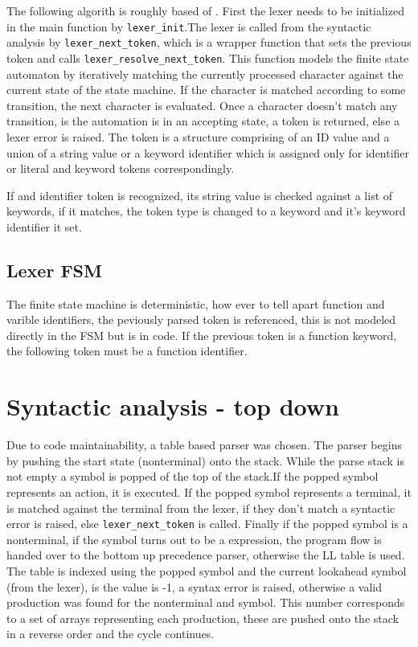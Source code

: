 \documentclass[11pt]{article}
\begin{document}
The following algorith is roughly based of \cite[p.~62]{10.5555/77624}. First the lexer needs to be initialized in the main function by \texttt{lexer\_init}.The lexer is called from the syntactic analysis by \texttt{lexer\_next\_token}, which is a wrapper function that sets the previous token and calls \texttt{lexer\_resolve\_next\_token}. This function models the finite state automaton by iteratively matching the currently processed character against the current state of the state machine. If the character is matched according to some transition, the next character is evaluated. Once a character doesn't match any transition, is the automation is in an accepting state, a token is returned, else a lexer error is raised. The token is a structure comprising of an ID value and a union of a string value or a keyword identifier which is assigned only for identifier or literal and keyword tokens correspondingly. 

If and identifier token is recognized, its string value is checked against a list of keywords, if it matches, the token type is changed to a keyword and it's keyword identifier it set.
\subsection{Lexer FSM}
The finite state machine is deterministic, how ever to tell apart function and varible identifiers, the peviously parsed token is referenced, this is not modeled directly in the FSM but is in code. If the previous token is a function keyword, the following token must be a function identifier.

\section{Syntactic analysis - top down}
Due to code maintainability, a table based parser was chosen. The parser begins by pushing the start state (nonterminal) onto the stack. While the parse stack is not empty a symbol is popped of the top of the stack.If the popped symbol represents an action, it is executed. If the popped symbol represents a terminal, it is matched against the terminal from the lexer, if they don't match a syntactic error is raised, else \texttt{lexer\_next\_token} is called. Finally if the popped symbol is a nonterminal, if the symbol turns out to be a expression, the program flow is handed over to the bottom up precedence parser, otherwise the LL table is used. The table is indexed using the popped symbol and the current lookahead symbol (from the lexer), is the value is -1, a syntax error is raised, otherwise a valid production was found for the nonterminal and symbol. This number corresponds to a set of arrays representing each production, these are pushed onto the stack in a reverse order and the cycle continues.\cite[p.~211]{10.5555/77624}
\end{document}
